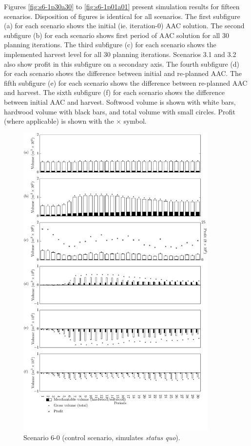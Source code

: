 Figures \ref{fig:s6-1p30a30} to \ref{fig:s6-1p01a01} present
simulation results for fifteen scenarios. %
Disposition of figures is identical for all scenarios. The
first subfigure (a) for each scenario shows the initial
(ie. iteration-0) AAC solution. The second subfigure (b) for each
scenario shows first period of AAC solution for all 30 planning
iterations. The third subfigure (c) for each scenario shows the
implemented harvest level for all 30 planning iterations. Scenarios
3.1 and 3.2 also show profit in this subfigure on a secondary
axis. The fourth subfigure (d) for each scenario shows the difference
between initial and re-planned AAC. The fifth subfigure (e) for each
scenario shows the difference between re-planned AAC and harvest.  The
sixth subfigure (f) for each scenario shows the difference between
initial AAC and harvest. Softwood volume is shown with white bars,
hardwood volume with black bars, and total volume with small
circles. Profit (where applicable) is shown with the $\times$
symbol. 

\begin{figure}[h]
  \centering
  \includegraphics[width=10cm]{images/appendix/s6-0}
  \caption{Scenario 6-0 (control scenario, simulates \emph{status quo}).}
  \label{fig:s6-0}
\end{figure}



